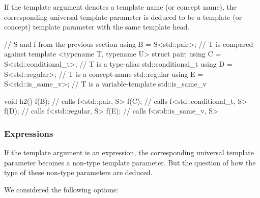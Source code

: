 \documentclass{wg21}
\begin{document}
If the template argument denotes a template name (or concept name), the corresponding universal template parameter
is deduced to be a template (or concept) template parameter with the same template head.

\begin{colorblock}
// S and f from the previous section
using B = S<std::pair>; // T is compared against template <typename T, typename U> struct pair;
using C = S<std::conditional_t>; // T is a type-alias std::conditional_t
using D = S<std::regular>; // T is a concept-name std::regular
using E = S<std::is_same_v>; // T is a variable-template std::is_same_v

void h2() {
  f(B{}); // calls f<std::pair, S>
  f(C{}); // calls f<std::conditional_t, S>
  f(D{}); // calls f<std::regular, S>
  f(E{}); // calls f<std::is_same_v, S>
}
\end{colorblock}

\subsubsection{Expressions}

If the template argument is an expression, the corresponding universal template parameter becomes a non-type template parameter.
But the question of how the type of these non-type parameters are deduced.

We considered the following options:
\end{document}
